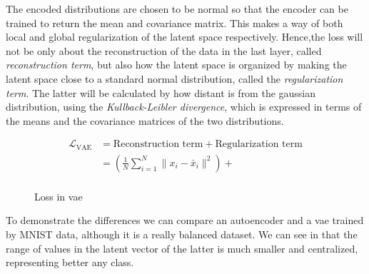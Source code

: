 \documentclass[11pt, a4paper]{article}
\begin{document}
	The encoded distributions are chosen to be normal so that the encoder can be trained to return the mean and covariance matrix. This makes a way of both local and global regularization of the latent space respectively. Hence,the loss will not be only about the reconstruction of the data in the last layer, called \textit{reconstruction term}, but also how the latent space is organized by making the latent space close to a standard normal distribution, called the \textit{regularization term}. The latter will be calculated by how distant is from the gaussian distribution, using the \textit{Kullback-Leibler divergence}, which is expressed in terms of the means and the covariance matrices of the two distributions.
	\begin{figure}[H]
		\begin{align*}
			\mathcal{L}_{\text{VAE}} &= \text{Reconstruction term} + \text{Regularization term}\\
			&= (\frac{1}{N} \sum_{i=1}^{N} \| x_i - \bar{x}_i \|^2) +  \\
		\end{align*}
		\caption{Loss in \gls{vae}}
	\end{figure}
	To demonstrate the differences we can compare an autoencoder and a \gls{vae} trained by MNIST data, although it is a really balanced dataset. We can see in  that the range of values in the latent vector of the latter is much smaller and centralized, representing better any class. %
\end{document}
